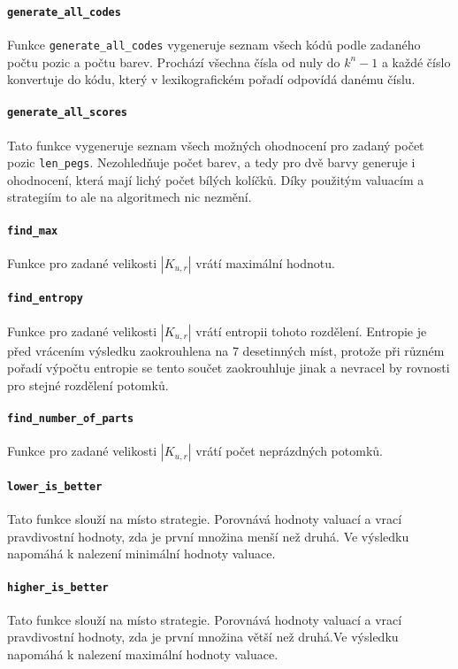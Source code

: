 \documentclass[12pt,a4paper]{article}
\begin{document}
\paragraph{\texttt{generate\_all\_codes}}
Funkce \texttt{generate\_all\_codes} vygeneruje seznam všech kódů podle zadaného počtu pozic a počtu barev. Prochází všechna čísla od nuly do $k^n - 1$ a každé číslo konvertuje do kódu, který v lexikografickém pořadí odpovídá danému číslu. 

\paragraph{\texttt{generate\_all\_scores}}
Tato funkce vygeneruje seznam všech možných ohodnocení pro zadaný počet pozic \texttt{len\_pegs}. Nezohledňuje počet barev, a tedy pro dvě barvy generuje i ohodnocení, která mají lichý počet bílých kolíčků. Díky použitým valuacím a strategiím to ale na algoritmech nic nezmění.

\paragraph{\texttt{find\_max}}
Funkce pro zadané velikosti $|K_{u,r}|$ vrátí maximální hodnotu. 

\paragraph{\texttt{find\_entropy}}
Funkce pro zadané velikosti $|K_{u,r}|$ vrátí entropii tohoto rozdělení. Entropie je před vrácením výsledku zaokrouhlena na 7 desetinných míst, protože při různém pořadí výpočtu entropie se tento součet zaokrouhluje jinak a nevracel by rovnosti pro stejné rozdělení potomků.

\paragraph{\texttt{find\_number\_of\_parts}}
Funkce pro zadané velikosti $|K_{u,r}|$ vrátí počet neprázdných potomků.

\paragraph{\texttt{lower\_is\_better}}
Tato funkce slouží na místo strategie. Porovnává hodnoty valuací a vrací pravdivostní hodnoty, zda je první množina menší než druhá. Ve výsledku napomáhá k nalezení minimální hodnoty valuace.

\paragraph{\texttt{higher\_is\_better}}
Tato funkce slouží na místo strategie. Porovnává hodnoty valuací a vrací pravdivostní hodnoty, zda je první množina větší než druhá.Ve výsledku napomáhá k nalezení maximální hodnoty valuace.
\end{document}
